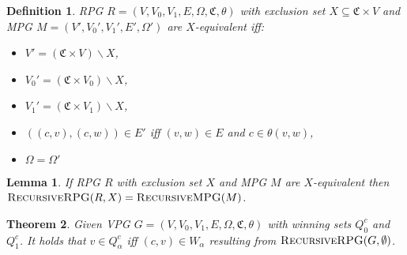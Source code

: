 \documentclass[]{article}
\newtheorem{definition}{Definition}[section]
\newtheorem{theorem}{Theorem}[section]
\newtheorem{lemma}[theorem]{Lemma}
\begin{document}
\begin{definition}
	RPG $R = (V,V_0,V_1,E,\Omega,\mathfrak{C},\theta)$ with exclusion set $X \subseteq \mathfrak{C} \times V$ and MPG $M = (V',V_0',V_1',E',\Omega')$ are $X$-equivalent iff:
	\begin{itemize}
		\item $V' = (\mathfrak{C} \times V) \backslash X$,
		\item $V_0' = (\mathfrak{C} \times V_0) \backslash X$,
		\item $V_1' = (\mathfrak{C} \times V_1) \backslash X$,
		\item $((c,v),(c,w)) \in E'$ iff $(v,w) \in E$ and $c \in \theta(v,w)$,
		\item $\Omega = \Omega'$
	\end{itemize}
\end{definition}
\begin{lemma}
	If RPG $R$ with exclusion set $X$ and MPG $M$ are $X$-equivalent then $\textsc{RecursiveRPG}(R,X) = \textsc{RecursiveMPG}(M)$.
\end{lemma}
\begin{theorem}
Given VPG $G = (V,V_0,V_1,E,\Omega,\mathfrak{C},\theta)$ with winning sets $Q_0^c$ and $Q_1^c$. It holds that $v \in Q_\alpha^c$ iff $(c,v) \in W_\alpha$ resulting from $\textsc{RecursiveRPG}(G,\emptyset)$.
\end{theorem}
 

\end{document}
